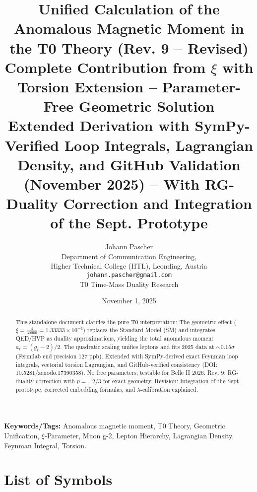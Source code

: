 \documentclass[12pt,a4paper]{article}
\title{\textbf{Unified Calculation of the Anomalous Magnetic Moment in the T0 Theory (Rev. 9 -- Revised)}\\[0.5cm]
	\large Complete Contribution from $\xi$ with Torsion Extension -- Parameter-Free Geometric Solution\\[0.3cm]
	\normalsize Extended Derivation with SymPy-Verified Loop Integrals, Lagrangian Density, and GitHub Validation (November 2025) -- With RG-Duality Correction and Integration of the Sept. Prototype}
\author{Johann Pascher\\
	\small Department of Communication Engineering,\\
	\small Higher Technical College (HTL), Leonding, Austria\\
	\small \texttt{johann.pascher@gmail.com}\\
	\small T0 Time-Mass Duality Research}
\date{November 1, 2025}
\theoremstyle{definition}
\begin{document}
	
	\maketitle
	\thispagestyle{fancy}
	
	\begin{abstract}
		This standalone document clarifies the pure T0 interpretation: The geometric effect ($\xi = \frac{4}{30000} = 1.33333 \times 10^{-4}$) replaces the Standard Model (SM) and integrates QED/HVP as duality approximations, yielding the total anomalous moment $a_\ell = (g_\ell - 2)/2$. The quadratic scaling unifies leptons and fits 2025 data at $\sim 0.15\sigma$ (Fermilab end precision 127 ppb). Extended with SymPy-derived exact Feynman loop integrals, vectorial torsion Lagrangian, and GitHub-verified consistency (DOI: 10.5281/zenodo.17390358). No free parameters; testable for Belle II 2026. Rev. 9: RG-duality correction with $p=-2/3$ for exact geometry. Revision: Integration of the Sept. prototype, corrected embedding formulas, and $\lambda$-calibration explained.
	\end{abstract}
	
	\textbf{Keywords/Tags:} Anomalous magnetic moment, T0 Theory, Geometric Unification, $\xi$-Parameter, Muon g-2, Lepton Hierarchy, Lagrangian Density, Feynman Integral, Torsion.
	
	\tableofcontents
	
	\section*{List of Symbols}
	
\end{document}
